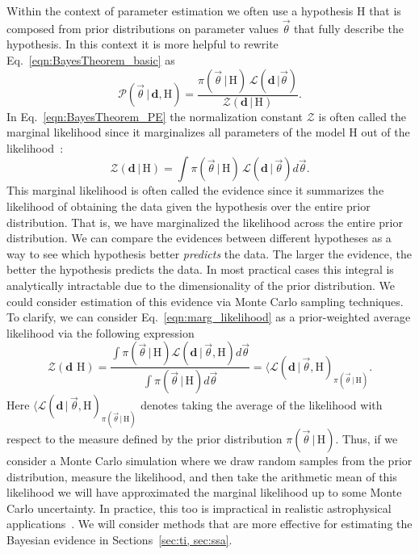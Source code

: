 Within the context of parameter estimation we often use a hypothesis H that is composed from prior distributions on parameter values $\vec{\theta}$ that fully describe the hypothesis. In this context it is more helpful to rewrite Eq.~\ref{eqn:BayesTheorem_basic} as
\begin{equation}\label{eqn:BayesTheorem_PE}
   \mathcal{P}(\vec{\theta} \, | \, \mathbf{d}, \mathrm{H}) = \frac{\pi(\vec{\theta} \, | \, \mathrm{H}) \, \mathcal{L}(\mathbf{d} \, | \vec{\theta})}{\mathcal{Z}(\mathbf{d} \, | \, \mathrm{H})}.
\end{equation} 
In Eq.~\ref{eqn:BayesTheorem_PE} the normalization constant $\mathcal{Z}$ is often called the marginal likelihood since it marginalizes all parameters of the model H out of the likelihood~\cite{hobson2010bayesian}:
\begin{equation}\label{eqn:marg_likelihood}
    \mathcal{Z}(\mathbf{d} \, | \, \mathrm{H}) = \int \pi(\vec{\theta} \, | \, \mathrm{H}) \, \mathcal{L}(\mathbf{d} \, | \, \vec{\theta}) d\vec{\theta}.
\end{equation} 
This marginal likelihood is often called the evidence since it summarizes the likelihood of obtaining the data given the hypothesis over the entire prior distribution. That is, we have marginalized the likelihood across the entire prior distribution. We can compare the evidences between different hypotheses as a way to see which hypothesis better \textit{predicts} the data. The larger the evidence, the better the hypothesis predicts the data. In most practical cases this integral is analytically intractable due to the dimensionality of the prior distribution. We could consider estimation of this evidence via Monte Carlo sampling techniques. To clarify, we can consider Eq.~\ref{eqn:marg_likelihood} as a prior-weighted average likelihood via the following expression
\begin{equation}
    \mathcal{Z}(\mathbf{d} \, \, \mathrm{H}) = \frac{\int \pi(\vec{\theta}\, | \, \mathrm{H}) \mathcal{L}(\mathbf{d} \, | \, \vec{\theta}, \mathrm{H}) d\vec{\theta}}
                                                    {\int \pi(\vec{\theta} \, | \, \mathrm{H}) d\vec{\theta}} = \langle \mathcal{L}(\mathbf{d} \, | \, \vec{\theta}, \mathrm{H})_{\pi(\vec{\theta} \, | \, \mathrm{H})}.
\end{equation}
Here $\langle \mathcal{L}(\mathbf{d} \, | \, \vec{\theta}, \mathrm{H})_{\pi(\vec{\theta} \, | \, \mathrm{H})}$ denotes taking the average of the likelihood with respect to the measure defined by the prior distribution $\pi(\vec{\theta} \, | \, \mathrm{H})$. Thus, if we consider a Monte Carlo simulation where  we draw random samples from the prior distribution, measure the likelihood, and then take the arithmetic mean of this likelihood we will have approximated the marginal likelihood up to some Monte Carlo uncertainty. In practice, this too is impractical in realistic astrophysical applications~\cite{wall2012practical}. We will consider methods that are more effective for estimating the Bayesian evidence in Sections~\ref{sec:ti, sec:ssa}.

